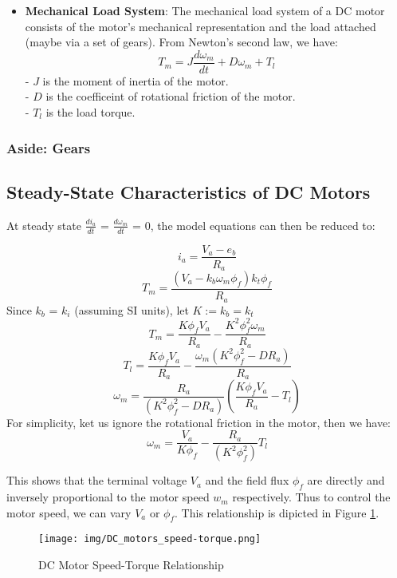 \documentclass[a4paper]{article}
\begin{document}
\begin{itemize}
    \item \textbf{Mechanical Load System}:
            The mechanical load system of a DC motor consists of the motor's mechanical representation and the load attached 
            (maybe via a set of gears). From Newton's second law, we have:
            $$ T_{m}= J\frac{d \omega_{m}}{dt} + D \omega_{m} + T_{l} $$
            - $J$ is the moment of inertia of the motor.\\
            - $D$ is the coefficeint of rotational friction of the motor.\\
            - $T_{l}$ is the load torque.\\

\end{itemize}

\subsubsection{Aside: Gears}

\subsection{Steady-State Characteristics of DC Motors}

At steady state $\frac{di_{a}}{dt}$ = $\frac{d\omega_{m}}{dt}$ = $0$, the model equations can then be reduced to:

$$ i_{a}= \frac{V_{a} - e_{b}}{R_{a}} $$
$$ T_{m}= \frac{\left(V_{a} - k_{b} \omega_{m} \phi_{f}\right) k_{t} \phi_{f}}{R_{a}} $$
Since $k_{b}$ = $k_{i}$ (assuming SI units), let $K:= k_{b}= k_{t}$
$$ T_{m}= \frac{ K \phi_{f} V_{a} }{R_{a}} - \frac{ K^{2} \phi_{f}^{2} \omega_{m} }{R_{a}} $$
$$ T_{l}= \frac{ K \phi_{f} V_{a} }{R_{a}} - \frac{ \omega_{m} \left( K^{2} \phi_{f}^{2} - D R_{a} \right) }{R_{a}} $$
$$ \omega_{m}=  \frac{ R_{a} }{ \left( K^{2} \phi_{f}^{2} - D R_{a} \right) }  \left( \frac{ K \phi_{f} V_{a} }{R_{a}} - T_{l} \right) $$
For simplicity, ket us ignore the rotational friction in the motor, then we have:
$$ \omega_{m}=  \frac{V_{a}}{ K \phi_{f} } - \frac{ R_{a} }{ \left( K^{2} \phi_{f}^{2} \right) } T_{l}  $$

This shows that the terminal voltage $V_{a}$ and the field flux $\phi_{f}$ are directly and inversely proportional to the motor speed 
$w_{m}$ respectively. Thus to control the motor speed, we can vary $V_{a}$ or $\phi_{f}$. This relationship is dipicted in Figure \ref{fig:DC_motor_speed_torque}.
\\
\begin{figure}
        \centering
        \texttt{[image: img/DC\_motors\_speed-torque.png]}
        \caption{DC Motor Speed-Torque Relationship \cite{kim17}}
        \label{fig:DC_motor_speed_torque}
\end{figure}
\end{document}
